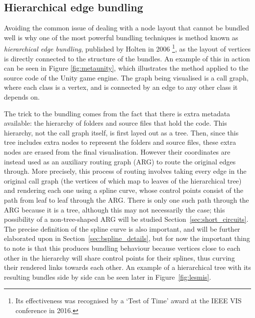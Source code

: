 \subsection{Hierarchical edge bundling}
\label{sec:heb_background}
Avoiding the common issue of dealing with a node layout that cannot be bundled well is why one of the most powerful bundling techniques is method known as \emph{hierarchical edge bundling}, published by Holten in 2006 \cite{Holten2006}\footnote{Its effectiveness was recognised by a `Test of Time' award at the IEEE VIS conference in 2016.}, as the layout of vertices is directly connected to the structure of the bundles.
An example of this in action can be seen in Figure \ref{fig:metaunity}, which illustrates the method applied to the source code of the Unity game engine. The graph being visualised is a call graph, where each class is a vertex, and is connected by an edge to any other class it depends on. 

The trick to the bundling comes from the fact that there is extra metadata available: the hierarchy of folders and source files that hold the code.
This hierarchy, not the call graph itself, is first layed out as a tree. Then, since this tree includes extra nodes to represent the folders and source files, these extra nodes are erased from the final visualisation. However their coordinates are instead used as an auxiliary routing graph (ARG) to route the original edges through.
More precisely, this process of routing involves taking every edge in the original call graph (the vertices of which map to leaves of the hierarchical tree) and rendering each one using a spline curve, whose control points consist of the path from leaf to leaf through the ARG. There is only one such path through the ARG because it is a tree, although this may not necessarily the case; this possibility of a non-tree-shaped ARG will be studied Section~\ref{sec:short_circuits}. The precise definition of the spline curve is also important, and will be further elaborated upon in Section~\ref{sec:bspline_details}, but for now the important thing to note is that this produces bundling behaviour because vertices close to each other in the hierarchy will share control points for their splines, thus curving their rendered links towards each other.
An example of a hierarchical tree with its resulting bundles side by side can be seen later in Figure~\ref{fig:lesmis}.

